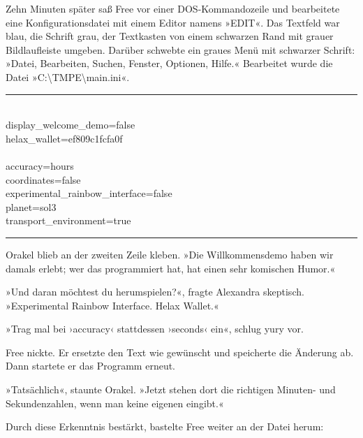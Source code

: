 Zehn Minuten später saß Free vor einer DOS-Kommandozeile und bearbeitete eine Konfigurationsdatei mit einem Editor namens »EDIT«. Das Textfeld war blau, die Schrift grau, der Textkasten von einem schwarzen Rand mit grauer Bildlaufleiste umgeben. Darüber schwebte ein graues Menü mit schwarzer Schrift: »Datei, Bearbeiten, Suchen, Fenster, Optionen, Hilfe.« Bearbeitet wurde die Datei »C:\textbackslash{}TMPE\textbackslash{}main.ini«.

\noindent \parbox{\textwidth}{ \vspace{3ex} \hrule \vspace{3ex}

    \begin{footnotesize}
    \begin{ttfamily}

\noindent [user]\\
\noindent display\_welcome\_demo=false\\
\noindent helax\_wallet=ef809c1fcfa0f\\
\noindent [advanced]\\
\noindent accuracy=hours\\
\noindent coordinates=false\\
\noindent experimental\_rainbow\_interface=false\\
\noindent planet=sol3\\
\noindent transport\_environment=true

    \end{ttfamily}
    \end{footnotesize}

\vspace{3ex} \hrule \vspace{3ex} }

Orakel blieb an der zweiten Zeile kleben. »Die Willkommensdemo haben wir damals erlebt; wer das programmiert hat, hat einen sehr komischen Humor.«

»Und daran möchtest du herumspielen?«, fragte Alexandra skeptisch. »Experimental Rainbow Interface. Helax Wallet.«

»Trag mal bei ›accuracy‹ stattdessen ›seconds‹ ein«, schlug yury vor.

Free nickte. Er ersetzte den Text wie gewünscht und speicherte die Änderung ab. Dann startete er das Programm erneut.

»Tatsächlich«, staunte Orakel. »Jetzt stehen dort die richtigen Minuten- und Sekundenzahlen, wenn man keine eigenen eingibt.«

Durch diese Erkenntnis bestärkt, bastelte Free weiter an der Datei herum:

